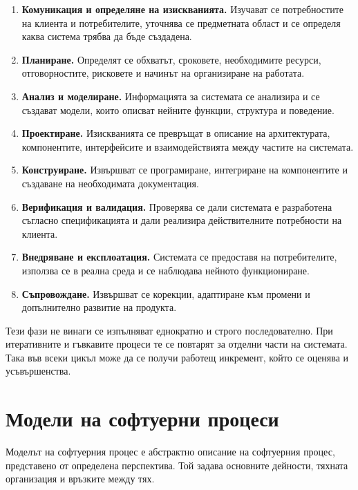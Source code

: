 \begin{enumerate}
    \item \textbf{Комуникация и определяне на изискванията.} Изучават се потребностите на клиента и потребителите, уточнява се предметната област и се определя каква система трябва да бъде създадена.
    \item \textbf{Планиране.} Определят се обхватът, сроковете, необходимите ресурси, отговорностите, рисковете и начинът на организиране на работата.
    \item \textbf{Анализ и моделиране.} Информацията за системата се анализира и се създават модели, които описват нейните функции, структура и поведение.
    \item \textbf{Проектиране.} Изискванията се превръщат в описание на архитектурата, компонентите, интерфейсите и взаимодействията между частите на системата.
    \item \textbf{Конструиране.} Извършват се програмиране, интегриране на компонентите и създаване на необходимата документация.
    \item \textbf{Верификация и валидация.} Проверява се дали системата е разработена съгласно спецификацията и дали реализира действителните потребности на клиента.
    \item \textbf{Внедряване и експлоатация.} Системата се предоставя на потребителите, използва се в реална среда и се наблюдава нейното функциониране.
    \item \textbf{Съпровождане.} Извършват се корекции, адаптиране към промени и допълнително развитие на продукта.
\end{enumerate}

Тези фази не винаги се изпълняват еднократно и строго последователно. При итеративните и гъвкавите процеси те се повтарят за отделни части на системата. Така във всеки цикъл може да се получи работещ инкремент, който се оценява и усъвършенства.

\section{Модели на софтуерни процеси}\label{s:26.3}

\begin{defn}
Моделът на софтуерния процес е абстрактно описание на софтуерния процес, представено от определена перспектива. Той задава основните дейности, тяхната организация и връзките между тях.
\end{defn}

